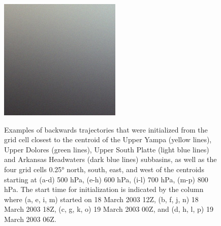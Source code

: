 \documentclass[draft]{agujournal2019}
\begin{document}
\begin{figure}
\includegraphics{example.jpg}
\label{fig:sensitivity_tests}
\caption{Examples of backwards trajectories that were initialized from the grid cell closest to the centroid of the Upper Yampa (yellow lines), Upper Dolores (green lines), Upper South Platte (light blue lines) and Arkansas Headwaters (dark blue lines) subbasins, as well as the four grid cells 0.25° north, south, east, and west of the centroids starting at (a-d) 500 hPa, (e-h) 600 hPa, (i-l) 700 hPa, (m-p) 800 hPa. The start time for initialization is indicated by the column where (a, e, i, m) started on 18 March 2003 12Z, (b, f, j, n) 18 March 2003 18Z, (c, g, k, o) 19 March 2003 00Z, and (d, h, l, p) 19 March 2003 06Z. }
\end{figure}
\end{document}
